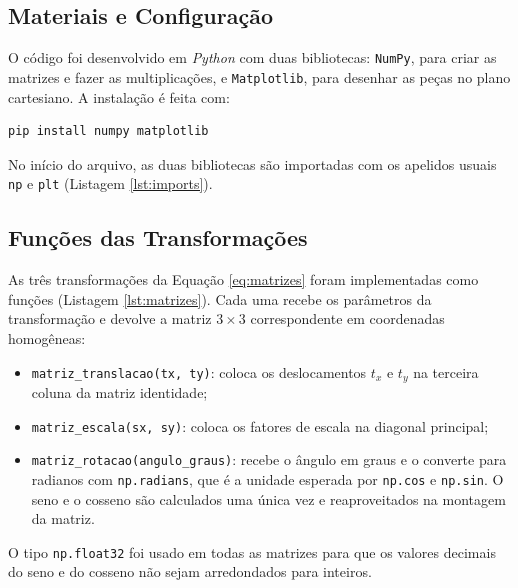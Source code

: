 \documentclass{article}
\begin{document}
\subsection{Materiais e Configuração}

O código foi desenvolvido em \textit{Python} com duas bibliotecas: \texttt{NumPy}, para criar as matrizes e fazer as multiplicações, e \texttt{Matplotlib}, para desenhar as peças no plano cartesiano. A instalação é feita com:

\begin{lstlisting}[style=pythonstyle, numbers=none]
pip install numpy matplotlib
\end{lstlisting}

No início do arquivo, as duas bibliotecas são importadas com os apelidos usuais \texttt{np} e \texttt{plt} (Listagem \ref{lst:imports}).



\subsection{Funções das Transformações}

As três transformações da Equação \ref{eq:matrizes} foram implementadas como funções (Listagem \ref{lst:matrizes}). Cada uma recebe os parâmetros da transformação e devolve a matriz $3\times3$ correspondente em coordenadas homogêneas:

\begin{itemize}
    \item \texttt{matriz\_translacao(tx, ty)}: coloca os deslocamentos $t_x$ e $t_y$ na terceira coluna da matriz identidade;
    \item \texttt{matriz\_escala(sx, sy)}: coloca os fatores de escala na diagonal principal;
    \item \texttt{matriz\_rotacao(angulo\_graus)}: recebe o ângulo em graus e o converte para radianos com \texttt{np.radians}, que é a unidade esperada por \texttt{np.cos} e \texttt{np.sin}. O seno e o cosseno são calculados uma única vez e reaproveitados na montagem da matriz.
\end{itemize}

O tipo \texttt{np.float32} foi usado em todas as matrizes para que os valores decimais do seno e do cosseno não sejam arredondados para inteiros.


\end{document}
